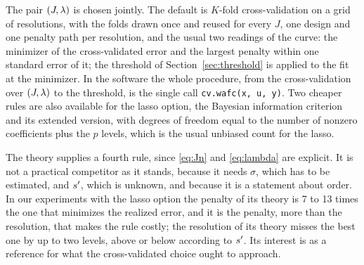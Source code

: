 The pair $(J,\lambda)$ is chosen jointly. The default is $K$-fold cross-validation on a grid of resolutions, with the folds drawn once and reused for
every $J$, one design and one penalty path per resolution, and the usual two
readings of the curve: the minimizer of the cross-validated error and the
largest penalty within one standard error of it; the threshold
of Section~\ref{sec:threshold} is applied to the fit at the minimizer. In the
software the whole procedure, from the cross-validation over $(J,\lambda)$ to the
threshold, is the single call \texttt{cv.wafc(x, u, y)}. Two cheaper rules are also
available for the lasso option, the Bayesian information criterion and its extended version, with
degrees of freedom equal to the number of nonzero coefficients plus the $p$
levels, which is the usual unbiased count for the lasso.

The theory supplies a fourth rule, since \eqref{eq:Jn} and \eqref{eq:lambda}
are explicit. It is not a practical competitor as it stands, because it needs
$\sigma$, which has to be estimated, and $s'$, which is unknown, and
because it is a statement about order. In our experiments with the
lasso option the penalty
 of its theory is 7 to 13 times the one that minimizes the realized error,
and it is the penalty, more than the resolution, that makes the rule costly;
the resolution
 of its theory misses the best one by up to two levels, above
or below according to $s'$.
Its interest is as a reference for
what the cross-validated choice ought to approach.

